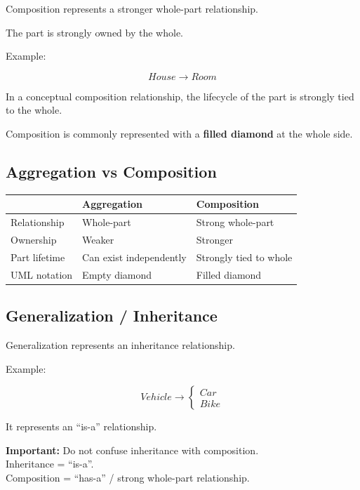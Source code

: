 \documentclass[11pt,a4paper]{article}
\begin{document}
Composition represents a stronger whole-part relationship.

The part is strongly owned by the whole.

Example:

\[
House \longrightarrow Room
\]

In a conceptual composition relationship, the lifecycle of the part is
strongly tied to the whole.

Composition is commonly represented with a \textbf{filled diamond} at the
whole side.

\subsection{Aggregation vs Composition}

\begin{tabularx}{\textwidth}{|p{}|X|X|}
\hline
 & \textbf{Aggregation} & \textbf{Composition}\\
\hline
Relationship & Whole-part & Strong whole-part\\
\hline
Ownership & Weaker & Stronger\\
\hline
Part lifetime & Can exist independently & Strongly tied to whole\\
\hline
UML notation & Empty diamond & Filled diamond\\
\hline
\end{tabularx}

\subsection{Generalization / Inheritance}

Generalization represents an inheritance relationship.

Example:

\[
Vehicle
\rightarrow
\begin{cases}
Car\\
Bike
\end{cases}
\]

It represents an ``is-a'' relationship.

\begin{exambox}
\textbf{Important:} Do not confuse inheritance with composition.\\
Inheritance = ``is-a''.\\
Composition = ``has-a'' / strong whole-part relationship.
\end{exambox}

\end{document}
